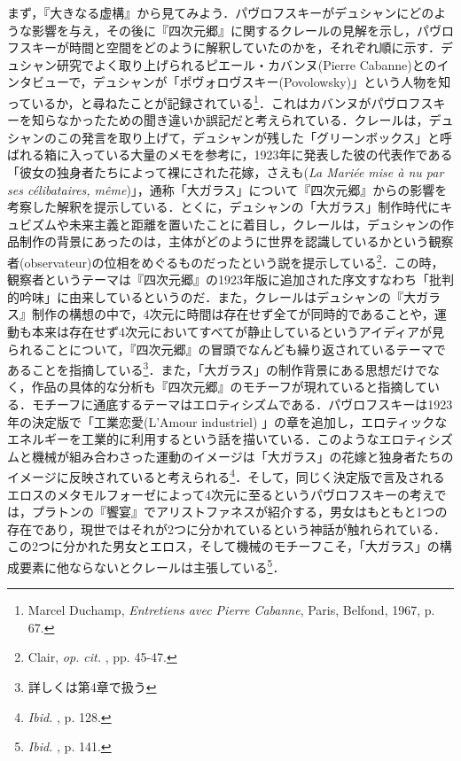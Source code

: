 まず，『大きなる虚構』から見てみよう．パヴロフスキーがデュシャンにどのような影響を与え，その後に『四次元郷』に関するクレールの見解を示し，パヴロフスキーが時間と空間をどのように解釈していたのかを，それぞれ順に示す．デュシャン研究でよく取り上げられるピエール・カバンヌ(Pierre Cabanne)とのインタビューで，デュシャンが「ポヴォロヴスキー(Povolowsky)」という人物を知っているか，と尋ねたことが記録されている\footnote{Marcel Duchamp, \emph{Entretiens avec Pierre Cabanne}, Paris, Belfond, 1967, p. 67.}．これはカバンヌがパヴロフスキーを知らなかったための聞き違いか誤記だと考えられている．クレールは，デュシャンのこの発言を取り上げて，デュシャンが残した「グリーンボックス」と呼ばれる箱に入っている大量のメモを参考に，1923年に発表した彼の代表作である「彼女の独身者たちによって裸にされた花嫁，さえも(\emph{La Mariée mise à nu par ses célibataires, même})」，通称「大ガラス」について『四次元郷』からの影響を考察した解釈を提示している．とくに，デュシャンの「大ガラス」制作時代にキュビズムや未来主義と距離を置いたことに着目し，クレールは，デュシャンの作品制作の背景にあったのは，主体がどのように世界を認識しているかという観察者(observateur)の位相をめぐるものだったという説を提示している\footnote{Clair, \emph{op. cit. }, pp. 45-47.}．この時，観察者というテーマは『四次元郷』の1923年版に追加された序文すなわち「批判的吟味」に由来しているというのだ．また，クレールはデュシャンの『大ガラス』制作の構想の中で，4次元に時間は存在せず全てが同時的であることや，運動も本来は存在せず4次元においてすべてが静止しているというアイディアが見られることについて，『四次元郷』の冒頭でなんども繰り返されているテーマであることを指摘している\footnote{詳しくは第4章で扱う}．また，「大ガラス」の制作背景にある思想だけでなく，作品の具体的な分析も『四次元郷』のモチーフが現れていると指摘している．モチーフに通底するテーマはエロティシズムである．パヴロフスキーは1923年の決定版で「工業恋愛(L’Amour industriel) 」の章を追加し，エロティックなエネルギーを工業的に利用するという話を描いている．このようなエロティシズムと機械が組み合わさった運動のイメージは「大ガラス」の花嫁と独身者たちのイメージに反映されていると考えられる\footnote{\emph{Ibid. }, p. 128. }．そして，同じく決定版で言及されるエロスのメタモルフォーゼによって4次元に至るというパヴロフスキーの考えでは，プラトンの『饗宴』でアリストファネスが紹介する，男女はもともと1つの存在であり，現世ではそれが2つに分かれているという神話が触れられている．この2つに分かれた男女とエロス，そして機械のモチーフこそ，「大ガラス」の構成要素に他ならないとクレールは主張している\footnote{\emph{Ibid. }, p. 141.}．

